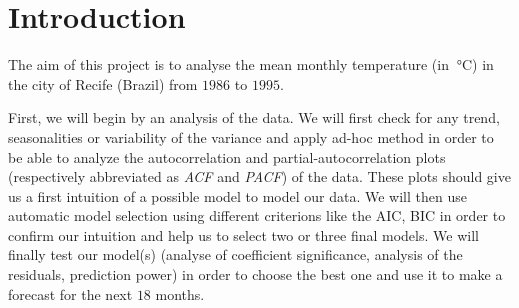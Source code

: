 \section{Introduction}

The aim of this project is to analyse the mean monthly temperature (in $\SI{}{\celsius}$) in the city of Recife (Brazil) from $1986$ to $1995$.

First, we will begin by an analysis of the data. We will first check for any trend, seasonalities or variability of the variance and apply ad-hoc method in order to be able to analyze the autocorrelation and partial-autocorrelation plots (respectively abbreviated as \textit{ACF} and \textit{PACF}) of the data. These plots should give us a first intuition of a possible model to model our data.
We will then use automatic model selection using different criterions like the AIC, BIC in order to confirm our intuition and help us to select two or three final models.
We will finally test our model(s) (analyse of coefficient significance, analysis of the residuals, prediction power) in order to choose the best one and use it to make a forecast for the next $18$ months.